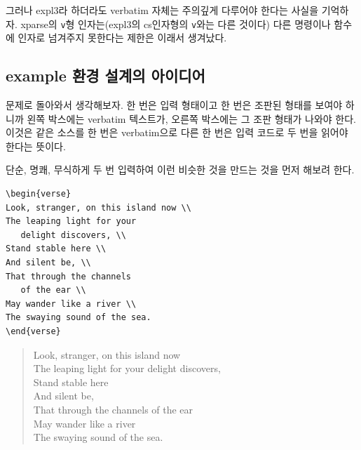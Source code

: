 그러나 expl3라 하더라도 verbatim 자체는 주의깊게 다루어야 한다는 사실을 기억하자. \textsf{xparse}의
\verb|v|형 인자는({\small expl3의 cs인자형의 \verb|v|와는 다른 것이다}) 다른 명령이나 함수에 인자로 넘겨주지 못한다는 제한은 이래서 생겨났다.

\subsection{example 환경 설계의 아이디어}

문제로 돌아와서 생각해보자. 한 번은 입력 형태이고 한 번은 조판된 형태를 보여야 하니까
왼쪽 박스에는 verbatim 텍스트가, 오른쪽 박스에는 그 조판 형태가 나와야 한다.
이것은 같은 소스를 한 번은 verbatim으로 다른 한 번은 입력 코드로 두 번을 읽어야 한다는 뜻이다.

단순, 명쾌, 무식하게 두 번 입력하여 이런 비슷한 것을 만드는 것을 먼저 해보려 한다.

\begin{examplebelow}
\begin{minipage}{.5\textwidth}
\begin{verbatim}
\begin{verse}
Look, stranger, on this island now \\
The leaping light for your 
   delight discovers, \\
Stand stable here \\
And silent be, \\
That through the channels 
   of the ear \\
May wander like a river \\
The swaying sound of the sea. 
\end{verse}
\end{verbatim}
\end{minipage}%
\begin{minipage}{.5\textwidth}
\begin{verse}
Look, stranger, on this island now \\
The leaping light for your 
delight discovers, \\
Stand stable here \\
And silent be, \\
That through the channels of the ear \\
May wander like a river \\
The swaying sound of the sea. 
\end{verse}
\end{minipage}
\end{examplebelow}

